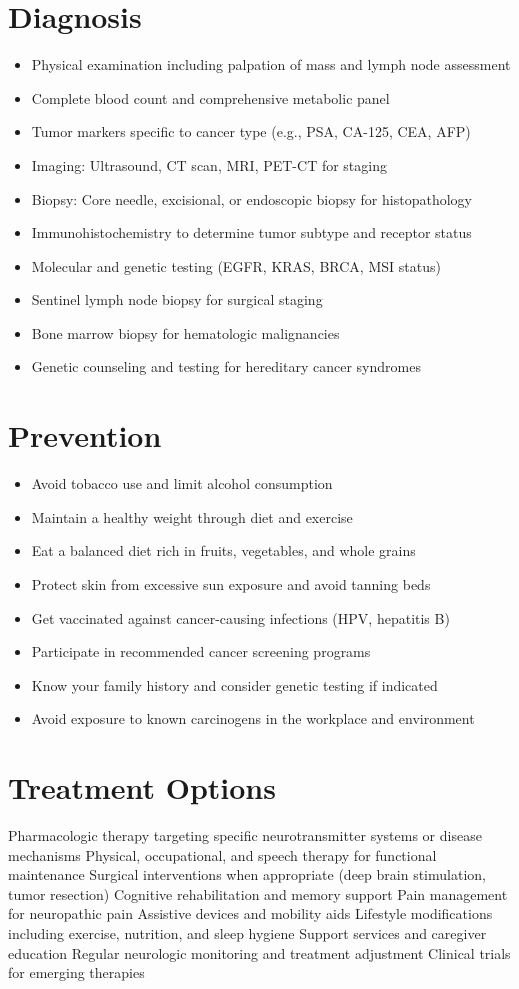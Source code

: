 \section{Diagnosis}
\begin{itemize}[noitemsep]
  \item Physical examination including palpation of mass and lymph node assessment
  \item Complete blood count and comprehensive metabolic panel
  \item Tumor markers specific to cancer type (e.g., PSA, CA-125, CEA, AFP)
  \item Imaging: Ultrasound, CT scan, MRI, PET-CT for staging
  \item Biopsy: Core needle, excisional, or endoscopic biopsy for histopathology
  \item Immunohistochemistry to determine tumor subtype and receptor status
  \item Molecular and genetic testing (EGFR, KRAS, BRCA, MSI status)
  \item Sentinel lymph node biopsy for surgical staging
  \item Bone marrow biopsy for hematologic malignancies
  \item Genetic counseling and testing for hereditary cancer syndromes
\end{itemize}
\section{Prevention}
\begin{itemize}[noitemsep]
  \item Avoid tobacco use and limit alcohol consumption
  \item Maintain a healthy weight through diet and exercise
  \item Eat a balanced diet rich in fruits, vegetables, and whole grains
  \item Protect skin from excessive sun exposure and avoid tanning beds
  \item Get vaccinated against cancer-causing infections (HPV, hepatitis B)
  \item Participate in recommended cancer screening programs
  \item Know your family history and consider genetic testing if indicated
  \item Avoid exposure to known carcinogens in the workplace and environment
\end{itemize}
\section{Treatment Options}
Pharmacologic therapy targeting specific neurotransmitter systems or disease mechanisms Physical, occupational, and speech therapy for functional maintenance Surgical interventions when appropriate (deep brain stimulation, tumor resection) Cognitive rehabilitation and memory support Pain management for neuropathic pain Assistive devices and mobility aids Lifestyle modifications including exercise, nutrition, and sleep hygiene Support services and caregiver education Regular neurologic monitoring and treatment adjustment Clinical trials for emerging therapies

